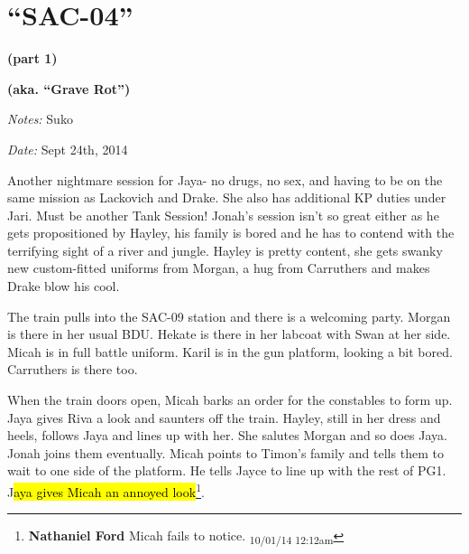 \setcounter{chapter}{ 32 }
\chapter{\textbf{``SAC-04''} }




\begin{center}
 {\LARGE \textbf{(part 1)} } 
\end{center}


\begin{center}
 {\LARGE \textbf{(aka. ``Grave Rot'')} } 
\end{center}




\textit{Notes:} Suko

\textit{Date:} Sept 24th, 2014



Another nightmare session for Jaya- no drugs, no sex, and having to be on the same mission as Lackovich and Drake.  She also has additional KP duties under Jari.  Must be another Tank Session!   Jonah's session isn't so great either as he gets propositioned by Hayley, his family is bored and he has to contend with the terrifying sight of a river and jungle.  Hayley is pretty content, she gets swanky new custom-fitted uniforms from Morgan, a hug from Carruthers and makes Drake blow his cool.  



\noindent\hrulefill





The train pulls into the SAC-09 station and there is a welcoming party.  Morgan is there in her usual BDU.  Hekate is there in her labcoat with Swan at her side.  Micah is in full battle uniform.  Karil is in the gun platform, looking a bit bored.  Carruthers is there too.



When the train doors open, Micah barks an order for the constables to form up.  Jaya gives Riva a look and saunters off the train. Hayley, still in her dress and heels, follows Jaya and lines up with her.  She salutes Morgan and so does Jaya.  Jonah joins them eventually.  Micah points to Timon's family and tells them to wait to one side of the platform.  He tells Jayce to line up with the rest of PG1.  J\hl{aya gives Micah an annoyed look}\footnote{\textbf{Nathaniel Ford }Micah fails to notice. \textsubscript{10/01/14 12:12am}}.



